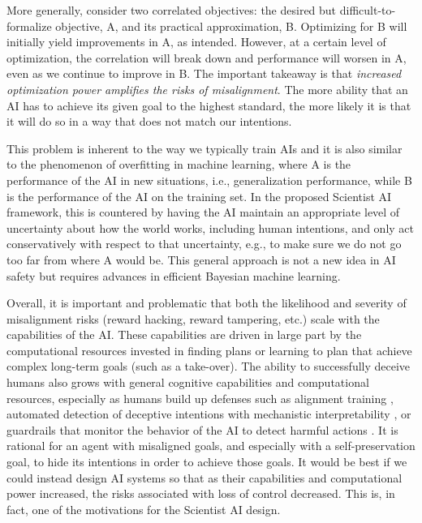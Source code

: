 More generally, consider two correlated objectives: the desired but difficult-to-formalize objective, A, and its practical approximation, B. Optimizing for B will initially yield improvements in A, as intended. However, at a certain level of optimization, the correlation will break down and performance will worsen in A, even as we continue to improve in B. The important takeaway is that \emph{increased optimization power amplifies the risks of misalignment}. The more ability that an AI has to achieve its given goal to the highest standard, the more likely it is that it will do so in a way that does not match our intentions. 

This problem is inherent to the way we typically train AIs and it is also similar to the phenomenon of overfitting in machine learning, where A is the performance of the AI in new situations, i.e., generalization performance, while B is the performance of the AI on the training set. In the proposed Scientist AI framework, this is countered by having the AI maintain an appropriate level of uncertainty about how the world works, including human intentions, and only act conservatively with respect to that uncertainty, e.g., to make sure we do not go too far from where A would be. This general approach is not a new idea in AI safety \cite{proceedings.neurips.cc.paper.files.paper.2016.hash.c3395dd46c34fa7fd8d729d8cf88b7a8.Abstract.html,arxiv.org.abs.1705.09990} but requires advances in efficient Bayesian machine learning.

Overall, it is important and problematic that both the likelihood and severity of misalignment risks (reward hacking, reward tampering, etc.) scale with the capabilities of the AI. These capabilities are driven in large part by the computational resources invested in finding plans or learning to plan that achieve complex long-term goals (such as a take-over). The ability to successfully deceive humans also grows with general cognitive capabilities and computational resources, especially as humans build up defenses such as alignment training \cite{arxiv.org.abs.2204.05862}, automated detection of deceptive intentions with mechanistic interpretability \cite{arxiv.org.abs.2404.14082}, or guardrails that monitor the behavior of the AI to detect harmful actions \cite{arxiv.org.abs.2406.12934}. It is rational for an agent with misaligned goals, and especially with a self-preservation goal, to hide its intentions in order to achieve those goals. It would be best if we could instead design AI systems so that as their capabilities and computational power increased, the risks associated with loss of control decreased. This is, in fact, one of the motivations for the Scientist AI design.

